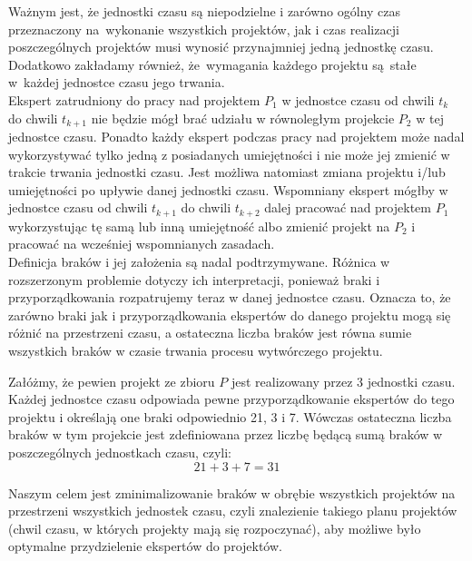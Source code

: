 \documentclass[12pt,a4paper]{article}
\theoremstyle{definition}
\begin{document}
\vspace{0.5em}
\noindent
Ważnym jest, że jednostki czasu są niepodzielne i zarówno ogólny czas przeznaczony na~wykonanie wszystkich projektów, jak i czas realizacji poszczególnych projektów musi wynosić przynajmniej jedną jednostkę czasu. Dodatkowo zakładamy również, że~wymagania każdego projektu są~stałe w~każdej jednostce czasu jego trwania.\\

\noindent
Ekspert zatrudniony do pracy nad projektem $P_1$ w jednostce czasu od chwili $t_k$ do chwili $t_{k+1}$ nie będzie mógł brać udziału w równoległym projekcie $P_2$ w tej jednostce czasu. Ponadto każdy ekspert podczas pracy nad projektem może nadal wykorzystywać tylko jedną z posiadanych umiejętności i nie może jej zmienić w trakcie trwania jednostki czasu. Jest możliwa natomiast zmiana projektu i/lub umiejętności po upływie danej jednostki czasu. Wspomniany ekspert mógłby w jednostce czasu od chwili $t_{k+1}$ do chwili $t_{k+2}$ dalej pracować nad projektem $P_1$ wykorzystując tę samą lub inną umiejętność albo zmienić projekt na $P_2$ i pracować na wcześniej wspomnianych zasadach.\\

\noindent
Definicja braków i jej założenia są nadal podtrzymywane. Różnica w rozszerzonym problemie dotyczy ich interpretacji, ponieważ braki i przyporządkowania rozpatrujemy teraz w danej jednostce czasu. Oznacza to, że zarówno braki jak i przyporządkowania ekspertów do danego projektu mogą się różnić na przestrzeni czasu, a ostateczna liczba braków jest równa sumie wszystkich braków w czasie trwania procesu wytwórczego projektu.\\

\begin{tcolorbox}[title=Przykład --- obliczanie ostatecznej liczby braków]
Załóżmy, że pewien projekt ze zbioru $P$ jest realizowany przez 3 jednostki czasu. Każdej jednostce czasu odpowiada pewne przyporządkowanie ekspertów do tego projektu i określają one braki odpowiednio 21, 3 i 7. Wówczas ostateczna liczba braków w tym projekcie jest zdefiniowana przez liczbę będącą sumą braków w poszczególnych jednostkach czasu, czyli:
$$21 + 3 + 7 = 31$$
\end{tcolorbox}

\vspace{0.5em}
\noindent
Naszym celem jest zminimalizowanie braków w obrębie wszystkich projektów na przestrzeni wszystkich jednostek czasu, czyli znalezienie takiego planu projektów (chwil czasu, w których projekty mają się rozpoczynać), aby możliwe było optymalne przydzielenie ekspertów do projektów.
\end{document}
